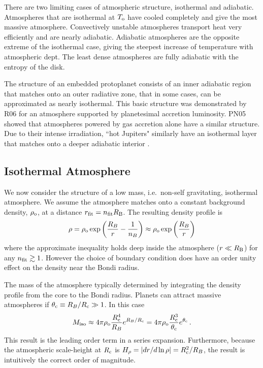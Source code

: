 \documentclass[12pt, preprint,numberedappendix]{emulateapj}
\newcommand{\RB}{R_{\rm B}}
\newcommand{\co}{_{\rm c}}
\newcommand{\di}{_{\rm o}}
\begin{document}
There are two limiting cases of atmospheric structure, isothermal and adiabatic.  Atmospheres that are isothermal at $T\di$ have cooled completely and give the most massive atmosphere.   Convectively unstable atmospheres transport heat very efficiently and are nearly adiabatic.  Adiabatic atmospheres are the opposite extreme of the isothermal case, giving the steepest increase of temperature with atmospheric dept.  The least dense atmospheres are fully adiabatic with the entropy of the disk. 

The structure of an embedded protoplanet consists of an inner adiabatic region that matches onto an outer radiative zone, that in some cases, can be approximated as nearly isothermal.  This basic structure was demonstrated by R06 for an atmosphere supported by planetesimal accretion luminosity.  PN05 showed that atmospheres powered by gas accretion alone have a similar structure.  Due to their intense irradiation, ``hot Jupiters" similarly have an isothermal layer that matches onto a deeper adiabatic interior \citep{ab06, ym10}.  

\subsection{Isothermal Atmosphere}
We now consider the structure of a low mass, i.e.\ non-self gravitating, isothermal atmosphere.  We assume the atmosphere matches onto a constant background density, $\rho\di$, at a distance $r_{\rm fit} = n_{\rm fit} \RB$.  The resulting density profile is
\begin{equation} \label{eq:rhoiso}
\rho = \rho\di \exp \left({R_B \over r} - {1 \over n_B} \right) \approx   \rho\di \exp \left(R_B \over r  \right)
\end{equation} 
where the approximate inequality holds deep inside the atmosphere ($r \ll \RB$) for any $n_{\rm fit} \gtrsim 1$.  However the choice of boundary condition does have an order unity effect on the density near the Bondi radius.   

The mass of the atmosphere typically determined by integrating the density profile from the core to the Bondi radius.  Planets can attract massive atmospheres if $\theta\co \equiv R_B/R\co \gg 1$.  In this case
\begin{equation} \label{eq:MatmISO}
M_{\rm iso} \approx 4 \pi \rho\di {R\co^4 \over R_B} e^{R_B/R\co} = 4 \pi \rho\di {R\co^3 \over \theta\co} e^{\theta\co}\, .
\end{equation} 
This result is the leading order term in a series expansion.  Furthermore, because the atmospheric scale-height at $R\co$ is $H_\rho = |dr /d\ln\rho| = R\co^2/R_B$, the result is intuitively the correct order of magnitude.
\end{document}
